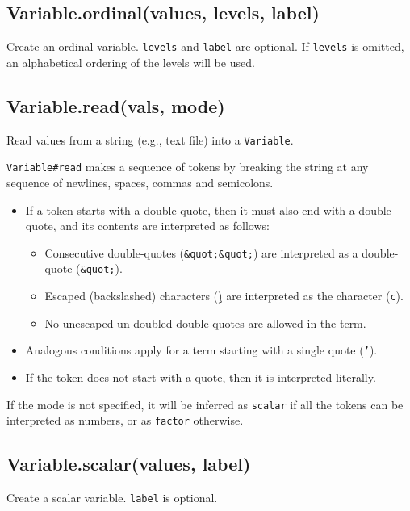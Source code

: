 \documentclass{article}
\begin{document}
    \subsection{Variable.ordinal(values, levels, label)}
    Create an ordinal variable. \texttt{levels} and \texttt{label} are optional. If \texttt{levels}
is omitted, an alphabetical ordering of the levels will be used.


    \subsection{Variable.read(vals, mode)}
    Read values from a string (e.g., text file) into a \texttt{Variable}.


\texttt{Variable\#read} makes a sequence of tokens by breaking the string at any sequence
of newlines, spaces, commas and semicolons.


\begin{itemize}

\item If a token starts with a double quote, then it must also end with a
double-quote, and its contents are interpreted as follows:\begin{itemize}

\item Consecutive double-quotes (\texttt{\&quot;\&quot;}) are interpreted as a double-quote (\texttt{\&quot;}).

\item Escaped (backslashed) characters (\texttt{\c}) are interpreted as the character (\texttt{c}).

\item No unescaped un-doubled double-quotes are allowed in the term.

\end{itemize}



\item Analogous conditions apply for a term starting with a single quote (\texttt{'}).

\item If the token does not start with a quote, then it is interpreted literally.

\end{itemize}

If the mode is not specified, it will be inferred as \texttt{scalar} if all the tokens
can be interpreted as numbers, or as \texttt{factor} otherwise.


    \subsection{Variable.scalar(values, label)}
    Create a scalar variable. \texttt{label} is optional.
\end{document}
